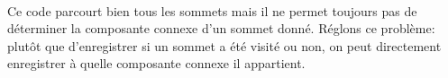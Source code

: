 

\paragraph{}
Ce code parcourt bien tous les sommets mais il ne permet toujours pas de déterminer la composante connexe d'un sommet donné. Réglons ce problème: plutôt que d'enregistrer si un sommet a été visité ou non, on peut directement enregistrer à quelle composante connexe il appartient.

